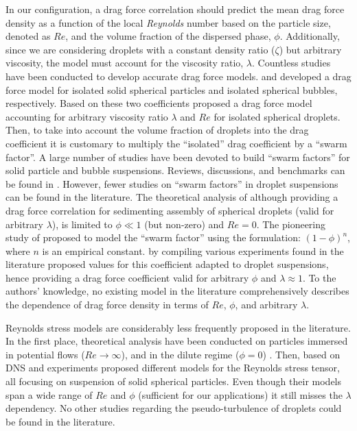 In our configuration, a drag force correlation should predict the mean drag force density as a function of the local \textit{Reynolds} number based on the particle size, denoted as $Re$, and the volume fraction of the dispersed phase, $\phi$. 
Additionally, since we are considering droplets with a constant density ratio ($\zeta$) but arbitrary viscosity, the model must account for the viscosity ratio, $\lambda$. 
Countless studies have been conducted to develop accurate drag force models. 
\citet{schiller1933} and \citet{mei1994} developed a drag force model for isolated solid spherical particles and isolated spherical bubbles, respectively.
Based on these two coefficients \citet{magnaudet1997forces} proposed a drag force model accounting for arbitrary viscosity ratio $\lambda$ and $Re$ for isolated spherical droplets. 
Then, to take into account the volume fraction of droplets into the drag coefficient it is customary to multiply the ``isolated'' drag coefficient by a ``swarm factor''. 
A large number of studies have been devoted to build ``swarm factors'' for solid particle and bubble suspensions. %
Reviews, discussions, and benchmarks can be found in \citet{simonin2016drag,tenneti2011drag,chen2023review}. 
However, fewer studies on ``swarm factors'' in droplet suspensions can be found in the literature. 
The theoretical analysis of \citet{wacholder1973,haber1981} although providing a drag force correlation for sedimenting assembly of spherical droplets (valid for arbitrary $\lambda$), is limited to $\phi \ll 1$ (but non-zero) and $Re =0$. 
The pioneering study of \citet{richardson1954} proposed to model the ``swarm factor'' using the formulation:  $(1-\phi)^n$, where $n$ is an empirical constant.  
\citet{ishii1979drag} by compiling various experiments found in the literature proposed values for this coefficient adapted to droplet suspensions, hence providing a drag force coefficient valid for arbitrary $\phi$ and $\lambda\approx 1$.
To the authors' knowledge, no existing model in the literature comprehensively describes the dependence of drag force density in terms of $Re$, $\phi$, and arbitrary $\lambda$. 

Reynolds stress models are considerably less frequently proposed in the literature. 
In the first place, theoretical analysis have been conducted on particles immersed in potential flows ($Re\to\infty$), and in the dilute regime ($\phi=0$) \citet{van1998pseudo}. 
Then, based on DNS and experiments \citet{mehrabadi2015pseudo,almeras2021statistics,xia2022improved} proposed different models for the Reynolds stress tensor, all focusing on suspension of solid spherical particles. 
Even though their models span a wide range of $Re$ and $\phi$ (sufficient for our applications) it still misses the $\lambda$ dependency. 
No other studies regarding the pseudo-turbulence of droplets could be found in the literature. 

